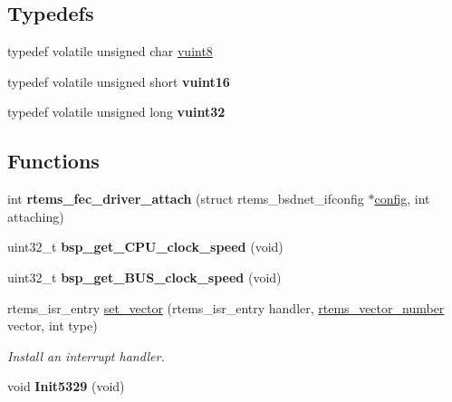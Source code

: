 \subsection*{Typedefs}
\begin{DoxyCompactItemize}
\item 
typedef volatile unsigned char \mbox{\hyperlink{group__RTEMSBSPsM68kMCF5329_gab2208c2cec6d83509a16c4b4e177bc20}{vuint8}}
\item 
\mbox{\label{group__RTEMSBSPsM68kMCF5329_gad7f560c21a88ddd3494daaad14f06ee2}} 
typedef volatile unsigned short {\bfseries vuint16}
\item 
\mbox{\label{group__RTEMSBSPsM68kMCF5329_ga1feacb5fd565aa7eef7b5607a67a624e}} 
typedef volatile unsigned long {\bfseries vuint32}
\end{DoxyCompactItemize}
\subsection*{Functions}
\begin{DoxyCompactItemize}
\item 
\mbox{\label{group__RTEMSBSPsM68kMCF5329_ga584ad500075555d3cd0a4f895d73df04}} 
int {\bfseries rtems\+\_\+fec\+\_\+driver\+\_\+attach} (struct rtems\+\_\+bsdnet\+\_\+ifconfig $\ast$\mbox{\hyperlink{structconfig__s}{config}}, int attaching)
\item 
\mbox{\label{group__RTEMSBSPsM68kMCF5329_gaf40918e55ef318de160e2e3174ba5562}} 
uint32\+\_\+t {\bfseries bsp\+\_\+get\+\_\+\+C\+P\+U\+\_\+clock\+\_\+speed} (void)
\item 
\mbox{\label{group__RTEMSBSPsM68kMCF5329_ga659d9c6679e263b0565119c541e15576}} 
uint32\+\_\+t {\bfseries bsp\+\_\+get\+\_\+\+B\+U\+S\+\_\+clock\+\_\+speed} (void)
\item 
rtems\+\_\+isr\+\_\+entry \mbox{\hyperlink{group__RTEMSBSPsM68kMCF5329_gab3388042c56b34c40be81fd5f028d97e}{set\+\_\+vector}} (rtems\+\_\+isr\+\_\+entry handler, \mbox{\hyperlink{group__ClassicINTR_ga3e434c197d99f128e78cae4d9358bd8b}{rtems\+\_\+vector\+\_\+number}} vector, int type)
\begin{DoxyCompactList}\small\item\em Install an interrupt handler. \end{DoxyCompactList}\item 
\mbox{\label{group__RTEMSBSPsM68kMCF5329_ga3978de7a34cd49f7c51c93eb9b831f11}} 
void {\bfseries Init5329} (void)
\end{DoxyCompactItemize}


